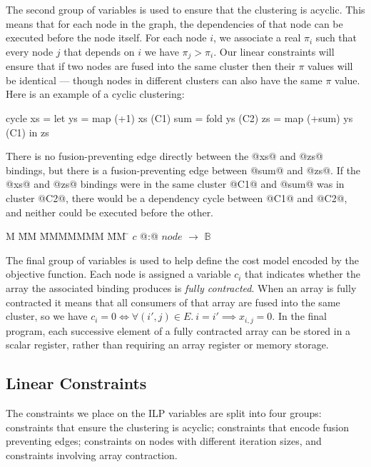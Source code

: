 The second group of variables is used to ensure that the clustering is acyclic. This means that for each node in the graph, the dependencies of that node can be executed before the node itself. For each node $i$, we associate a real $\pi_i$ such that every node $j$ that depends on $i$ we have $\pi_j > \pi_i$. Our linear constraints will ensure that if two nodes are fused into the same cluster then their $\pi$ values will be identical --- though nodes in different clusters can also have the same $\pi$ value. Here is an example of a cyclic clustering:
\begin{code}
  cycle xs  = let ys  = map (+1) xs     (C1)
                  sum = fold ys         (C2)
                  zs  = map (+sum) ys   (C1)
              in  zs
\end{code}

There is no fusion-preventing edge directly between the @xs@ and @zs@ bindings, but there is a fusion-preventing edge between @sum@ and @zs@. If the @xs@ and @zs@ bindings were in the same cluster @C1@ and @sum@ was in cluster @C2@, there would be a dependency cycle between @C1@ and @C2@, and neither could be executed before the other.
\begin{tabbing}
M   \= MM \= MMMMMMM \= MM \= \kill
$c$   \> @:@  \> $node$             \> $\to$ \> $\mathbb{B}$
\end{tabbing}

The final group of variables is used to help define the cost model encoded by the objective function. Each node is assigned a variable $c_i$ that indicates whether the array the associated binding produces is \emph{fully contracted}. When an array is fully contracted it means that all consumers of that array are fused into the same cluster, so we have $c_i = 0 \iff \forall (i',j) \in E.\ i = i' \implies x_{i,j} = 0$. In the final program, each successive element of a fully contracted array can be stored in a scalar register, rather than requiring an array register or memory storage. 


\subsection{Linear Constraints}
\label{s:LinearConstraints}
The constraints we place on the ILP variables are split into four groups: constraints that ensure the clustering is acyclic; constraints that encode fusion preventing edges; constraints on nodes with different iteration sizes, and constraints involving array contraction. 

